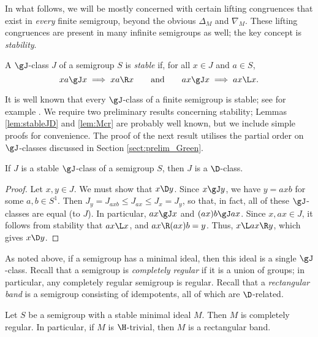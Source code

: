 In what follows, we will be mostly concerned with certain lifting congruences
that exist in \emph{every} finite semigroup, beyond the obvious $\Delta_M$ and
$\nabla_M$.  These lifting congruences are present in many infinite semigroups as well; the key concept is \emph{stability}.

\begin{definition}\label{defn:stableJ}
A $\gJ$-class $J$ of a semigroup $S$ is \emph{stable} if, for all $x\in J$ and $a\in S$,
\[
xa\gJ x \implies xa\R x \qquad\text{and}\qquad ax\gJ x \implies ax\L x.
\]
\end{definition}

It is well known that every $\gJ$-class of a finite semigroup is stable; see for example \cite[Theorem A.2.4]{RSbook}.  We require two preliminary results concerning stability; Lemmas \ref{lem:stableJD} and \ref{lem:Mcr} are probably well known, but we include simple proofs for convenience.  The proof of the next result utilises the partial order on $\gJ$-classes discussed in Section \ref{sect:prelim_Green}.

\begin{lemma}\label{lem:stableJD}
If $J$ is a stable $\gJ$-class of a semigroup $S$, then $J$ is a $\D$-class.
\end{lemma}

\begin{proof}
Let $x,y\in J$.  We must show that $x\D y$.  Since $x\gJ y$, we have $y=axb$ for some $a,b\in S^1$.  Then $J_y = J_{axb} \leq J_{ax} \leq J_x = J_y$, so that, in fact, all of these $\gJ$-classes are equal (to $J$).  In particular, $ax\gJ x$ and $(ax)b\gJ ax$.  Since $x,ax\in J$, it follows from stability that $ax\L x$, and $ax \R (ax)b=y$.  Thus, $x\L ax\R y$, which gives $x\D y$.
\end{proof}

As noted above, if a semigroup has a minimal ideal, then this ideal is a single $\gJ$-class.  Recall that a semigroup is \emph{completely regular} if it is a union of groups; in particular, any completely regular semigroup is regular.  Recall that a \emph{rectangular band} is a semigroup consisting of idempotents, all of which are $\D$-related.

\begin{lemma}\label{lem:Mcr}
Let $S$ be a semigroup with a stable minimal ideal $M$.  Then $M$ is completely regular.  In particular, if $M$ is $\H$-trivial, then $M$ is a rectangular band.
\end{lemma}

